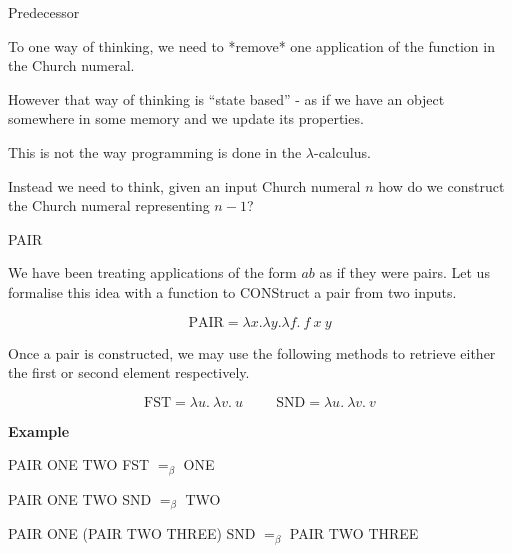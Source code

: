 \documentclass{beamer}
\begin{document}
\begin{frame}{Predecessor}

  
  To one way of thinking, we need to *remove* one application of the function in the Church numeral. 
  
  \vspace{15mm}
  
  However that way of thinking is ``state based'' - as if we have an object somewhere in some memory and we update its properties. 
  
  \vspace{5mm}
  
  This is not the way programming is done in the $\lambda$-calculus. 
  
  \vspace{5mm}
  
  Instead we need to think, given an input Church numeral $n$ how do we construct the Church numeral representing $n-1$?
  
  \vspace{1cm}
  
\end{frame}

\begin{frame}{PAIR}

  We have been treating applications of the form $ab$ as if they were pairs. Let us formalise this idea with a function to CONStruct a pair from two inputs.
  
  $$ \text{PAIR} = \lambda x. \lambda y. \lambda f. \ f \ x \ y$$
  
  Once a pair is constructed, we may use the following methods to retrieve either the first or second element respectively. 
  
  $$\text{FST} = \lambda u. \ \lambda v. \ u \hspace{1cm} \text{SND} = \lambda u. \ \lambda v. \ v $$
  
  {\bf Example}
  
  PAIR ONE TWO FST  $=_{\beta}$ ONE
  
  PAIR ONE TWO SND  $=_{\beta}$ TWO
  
  PAIR ONE (PAIR TWO THREE) SND $=_{\beta}$ PAIR TWO THREE
  
\end{frame}
\end{document}
